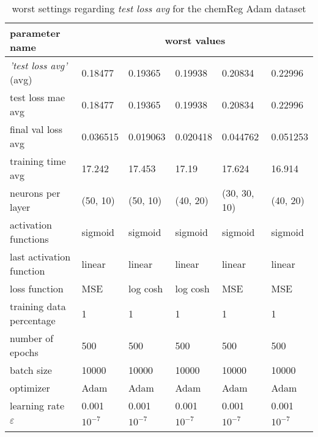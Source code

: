 \begin{longtable}{|l|l|l|l|l|>{\columncolor{worstColumnColor}}l|}
\hline
\textbf{parameter name} & \multicolumn{5}{c|}{\textbf{worst values}} \\
\hline
\textit{'test loss avg'} (avg) & 0.18477 & 0.19365 & 0.19938 & 0.20834 & 0.22996 \\
test loss mae avg        & 0.18477 & 0.19365 & 0.19938 & 0.20834 & 0.22996 \\
final val loss avg       & 0.036515 & 0.019063 & 0.020418 & 0.044762 & 0.051253 \\
training time avg        & 17.242  & 17.453  & 17.19   & 17.624  & 16.914  \\
neurons per layer        & (50, 10) & (50, 10) & (40, 20) & (30, 30, 10) & (40, 20) \\
{\color{equalParamColor} activation functions } & {\color{equalParamColor} sigmoid } & {\color{equalParamColor} sigmoid } & {\color{equalParamColor} sigmoid } & {\color{equalParamColor} sigmoid } & {\color{equalParamColor} sigmoid } \\
{\color{equalParamColor} last activation function } & {\color{equalParamColor} linear } & {\color{equalParamColor} linear } & {\color{equalParamColor} linear } & {\color{equalParamColor} linear } & {\color{equalParamColor} linear } \\
loss function            & MSE     & log cosh & log cosh & MSE     & MSE     \\
{\color{equalParamColor} training data percentage } & {\color{equalParamColor} 1 } & {\color{equalParamColor} 1 } & {\color{equalParamColor} 1 } & {\color{equalParamColor} 1 } & {\color{equalParamColor} 1 } \\
{\color{equalParamColor} number of epochs } & {\color{equalParamColor} 500 } & {\color{equalParamColor} 500 } & {\color{equalParamColor} 500 } & {\color{equalParamColor} 500 } & {\color{equalParamColor} 500 } \\
{\color{equalParamColor} batch size } & {\color{equalParamColor} 10000 } & {\color{equalParamColor} 10000 } & {\color{equalParamColor} 10000 } & {\color{equalParamColor} 10000 } & {\color{equalParamColor} 10000 } \\
{\color{equalParamColor} optimizer } & {\color{equalParamColor} Adam } & {\color{equalParamColor} Adam } & {\color{equalParamColor} Adam } & {\color{equalParamColor} Adam } & {\color{equalParamColor} Adam } \\
{\color{equalParamColor} learning rate } & {\color{equalParamColor} 0.001 } & {\color{equalParamColor} 0.001 } & {\color{equalParamColor} 0.001 } & {\color{equalParamColor} 0.001 } & {\color{equalParamColor} 0.001 } \\
{\color{equalParamColor} $\varepsilon$ } & {\color{equalParamColor} $10^{-7}$ } & {\color{equalParamColor} $10^{-7}$ } & {\color{equalParamColor} $10^{-7}$ } & {\color{equalParamColor} $10^{-7}$ } & {\color{equalParamColor} $10^{-7}$ } \\
\hline

\caption{worst settings regarding \textit{test loss avg} for the chemReg Adam dataset}
\label{table:test_loss_avg_worst_chemreg_adam}
\end{longtable}

